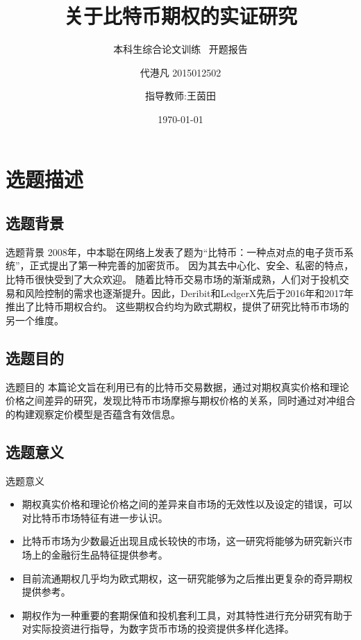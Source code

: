 \documentclass[11pt,dark]{mathbeamer}
\title{关于比特币期权的实证研究 }
\subtitle{本科生综合论文训练 \  开题报告}
\author[代港凡 2015012502]{代港凡 2015012502 \and 指导教师:王茵田}
\institute{清华大学经济管理学院}
\date{\today}
\begin{document}
\section{选题描述}

\subsection{选题背景}
\begin{frame}{选题背景}
    2008年，中本聪在网络上发表了题为“比特币：一种点对点的电子货币系统”\cite{Nakamoto_bitcoin:a}，正式提出了第一种完善的加密货币。
    因为其去中心化、安全、私密的特点，比特币很快受到了大众欢迎。\newline
    随着比特币交易市场的渐渐成熟，人们对于投机交易和风险控制的需求也逐渐提升。因此，Deribit和LedgerX先后于2016年和2017年推出了比特币期权合约。
    \newline 这些期权合约均为欧式期权，提供了研究比特币市场的另一个维度。
  \end{frame}

\subsection{选题目的}
\begin{frame}{选题目的}
  本篇论文旨在利用已有的比特币交易数据，通过对期权真实价格和理论价格之间差异的研究，发现比特币市场摩擦与期权价格的关系，同时通过对冲组合的构建观察定价模型是否蕴含有效信息。
\end{frame}

\subsection{选题意义}
\begin{frame}{选题意义}
  \begin{itemize}
    \item 期权真实价格和理论价格之间的差异来自市场的无效性以及设定的错误，可以对比特币市场特征有进一步认识。
    \item  比特币市场为少数最近出现且成长较快的市场，这一研究将能够为研究新兴市场上的金融衍生品特征提供参考。
    \item 目前流通期权几乎均为欧式期权，这一研究能够为之后推出更复杂的奇异期权提供参考。
    \item 期权作为一种重要的套期保值和投机套利工具，对其特性进行充分研究有助于对实际投资进行指导，为数字货币市场的投资提供多样化选择。
  \end{itemize}
\end{frame}
\end{document}
